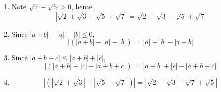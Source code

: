\begin{solution}
  \begin{enumerate}[label=(\roman*)]
    \item Note $\sqrt{7}-\sqrt{5}>0$, hence
    \begin{equation*}
      |\sqrt{2}+\sqrt{3}-\sqrt{5}+\sqrt{7}|=
      \sqrt{2}+\sqrt{3}-\sqrt{5}+\sqrt{7}
    \end{equation*}
    \item Since $|a+b|-|a|-|b|\leq 0$,
    \begin{equation*}
      |(|a+b|-|a|-|b|)|=|a|+|b|-|a+b|
    \end{equation*}
    \item Since $|a+b+c|\leq|a+b|+|c|$,
    \begin{equation*}
      |(|a+b|+|c|-|a+b+c|)|=|a+b|+|c|-|a+b+c|
    \end{equation*}
    \item
    \begin{equation*}
      |(|\sqrt{2}+\sqrt{3}|-|\sqrt{5}-\sqrt{7}|)|
      =|\sqrt{2}+\sqrt{3}-\sqrt{7}+\sqrt{5}|
    \end{equation*}
  \end{enumerate}
\end{solution}

